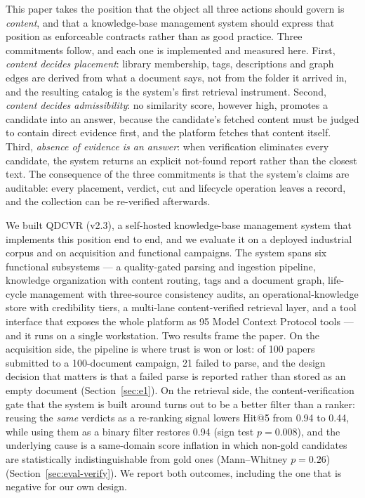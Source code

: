 This paper takes the position that the object all three actions should govern
is \emph{content}, and that a knowledge-base management system should express
that position as enforceable contracts rather than as good practice. Three
commitments follow, and each one is implemented and measured here. First,
\emph{content decides placement}: library membership, tags, descriptions and
graph edges are derived from what a document says, not from the folder it
arrived in, and the resulting catalog is the system's first retrieval
instrument. Second, \emph{content decides admissibility}: no similarity score,
however high, promotes a candidate into an answer, because the candidate's
fetched content must be judged to contain direct evidence first, and the
platform fetches that content itself. Third, \emph{absence of evidence is an
answer}: when verification eliminates every candidate, the system returns an
explicit not-found report rather than the closest text. The consequence of the
three commitments is that the system's claims are auditable: every placement,
verdict, cut and lifecycle operation leaves a record, and the collection can
be re-verified afterwards.

We built QDCVR (v2.3), a self-hosted knowledge-base management system that
implements this position end to end, and we evaluate it on a deployed
industrial corpus and on acquisition and functional campaigns. The system
spans six functional subsystems --- a quality-gated parsing and ingestion
pipeline, knowledge organization with content routing, tags and a document
graph, life-cycle management with three-source consistency audits, an
operational-knowledge store with credibility tiers, a multi-lane
content-verified retrieval layer, and a tool interface that exposes the whole
platform as 95 Model Context Protocol tools \cite{mcp} --- and it runs on a
single workstation. Two results frame the paper. On the acquisition side, the
pipeline is where trust is won or lost: of 100 papers submitted to a
100-document campaign, 21 failed to parse, and the design decision that
matters is that a failed parse is reported rather than stored as an empty
document (Section~\ref{sec:e1}). On the retrieval side, the
content-verification gate that the system is built around turns out to be a
better filter than a ranker: reusing the \emph{same} verdicts as a re-ranking
signal lowers Hit@5 from 0.94 to 0.44, while using them as a binary filter
restores 0.94 (sign test $p = 0.008$), and the underlying cause is a
same-domain score inflation in which non-gold candidates are statistically
indistinguishable from gold ones (Mann--Whitney $p = 0.26$)
(Section~\ref{sec:eval-verify}). We report both outcomes, including the one
that is negative for our own design.

